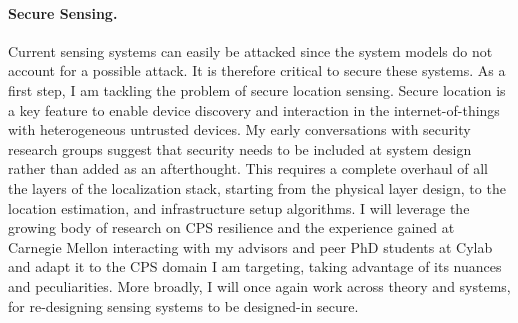 \documentclass[10pt]{article}
\begin{document}
\paragraph{Secure Sensing. }
Current sensing systems can easily be attacked since the system models do not account for a possible attack. It is therefore critical to secure these systems. As a first step, I am tackling the problem of secure location sensing. Secure location is a key feature to enable device discovery and interaction in the internet-of-things with heterogeneous untrusted devices. My early conversations with security research groups suggest that security needs to be included at system design rather than added as an afterthought. This requires a complete overhaul of all the layers of the localization stack, starting from the physical layer design, to the location estimation, and infrastructure setup algorithms. I will leverage the growing body of research on CPS resilience and the experience gained at Carnegie Mellon interacting with my advisors and peer PhD students at Cylab and adapt it to the CPS domain I am targeting, taking advantage of its nuances and peculiarities.  More broadly, I will once again work across theory and systems, for re-designing sensing systems to be designed-in secure. 

\end{document}
